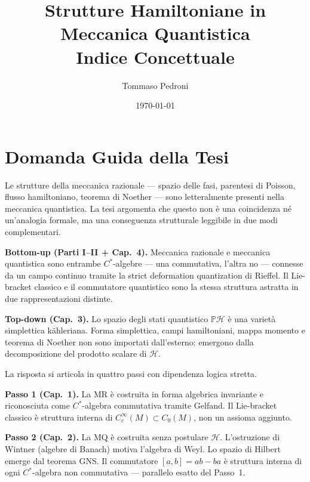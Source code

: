 \documentclass[12pt, a4paper]{article}
\title{%
	\textbf{Strutture Hamiltoniane in Meccanica Quantistica}\\[6pt]
	\normalsize Indice Concettuale
}
\author{Tommaso Pedroni}
\date{\today}
\begin{document}
	
	\maketitle
	\tableofcontents
	\newpage
	
	\section*{Domanda Guida della Tesi}
	
	Le strutture della meccanica razionale --- spazio delle fasi, parentesi di Poisson,
	flusso hamiltoniano, teorema di Noether --- sono letteralmente presenti nella meccanica
	quantistica. La tesi argomenta che questo non è una coincidenza né un'analogia formale,
	ma una conseguenza strutturale leggibile in due modi complementari.
	
	\medskip
	
	\textbf{Bottom-up (Parti I--II + Cap.\ 4).} Meccanica razionale e meccanica quantistica
	sono entrambe $C^*$-algebre --- una commutativa, l'altra no --- connesse da un campo
	continuo tramite la strict deformation quantization di Rieffel. Il Lie-bracket classico
	e il commutatore quantistico sono la stessa struttura astratta in due rappresentazioni
	distinte.
	
	\medskip
	
	\textbf{Top-down (Cap.\ 3).} Lo spazio degli stati quantistico $\mathbb{P}\mathcal{H}$
	è una varietà simplettica kähleriana. Forma simplettica, campi hamiltoniani, mappa
	momento e teorema di Noether non sono importati dall'esterno: emergono dalla
	decomposizione del prodotto scalare di $\mathcal{H}$.
	
	\medskip
	
	La risposta si articola in quattro passi con dipendenza logica stretta.
	
	\medskip
	
	\textbf{Passo 1 (Cap.\ 1).} La MR è costruita in forma algebrica invariante e
	riconosciuta come $C^*$-algebra commutativa tramite Gelfand. Il Lie-bracket classico
	è struttura interna di $C^\infty_c(M)\subset C_0(M)$, non un assioma aggiunto.
	
	\medskip
	
	\textbf{Passo 2 (Cap.\ 2).} La MQ è costruita senza postulare $\mathcal{H}$.
	L'ostruzione di Wintner (algebre di Banach) motiva l'algebra di Weyl. Lo spazio
	di Hilbert emerge dal teorema GNS. Il commutatore $[a,b]=ab-ba$ è struttura interna
	di ogni $C^*$-algebra non commutativa --- parallelo esatto del Passo~1.
	
\end{document}
